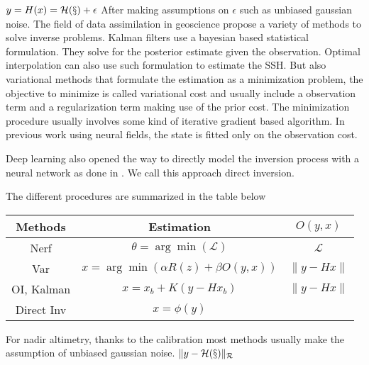 \begin{bibunit}
$y = H(x) = \cal{H}(x) + \epsilon$
After making assumptions on $\epsilon$ such as unbiased gaussian noise.
The field of data assimilation in geoscience propose a variety of methods to solve inverse problems.
Kalman filters use a bayesian based statistical formulation. They solve for the posterior estimate given the observation. Optimal interpolation can also use such formulation to estimate the SSH. 
But also variational methods that formulate the estimation as a minimization problem, the objective to minimize is called variational cost and usually include a observation term and a regularization term making use of the prior cost.
The minimization procedure usually involves some kind of iterative gradient based algorithm.
In previous work using neural fields, the state is fitted only on the observation cost.


Deep learning also opened the way to directly model the inversion process with a neural network as done in \cite{}. We call this approach direct inversion.



The different procedures are summarized in the table below

\begin{table}
  \begin{tabular}{|c|c|c|}
\hline
Methods & Estimation & $O(y, x)$ \\
\hline
Nerf & $\theta = \arg\min(\mathcal{L})$ & $\mathcal{L}$ \\
\hline
Var & $x = \arg\min(\alpha R(z) + \beta O(y, x))$ & $\|y - Hx\|$ \\
\hline
OI, Kalman & $x = x_b + K(y - Hx_b)$ & $\|y - Hx\|$ \\
\hline
Direct Inv & $x = \phi(y)$ & \\
\hline
\end{tabular}

\end{table}

%



For nadir altimetry, thanks to the calibration  most methods usually make the assumption of unbiased gaussian noise. 
$\| y - \cal{H}(x)\|_R$ 



\end{bibunit}
